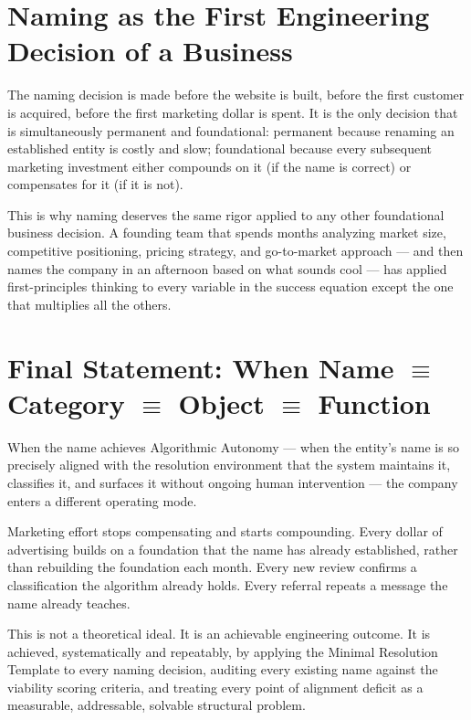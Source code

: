 \documentclass[12pt, openany]{book}
\theoremstyle{thmstyle}
\theoremstyle{defstyle}
\begin{document}
\section*{Naming as the First Engineering Decision of a Business}

The naming decision is made before the website is built, before the first customer is acquired, before the first marketing dollar is spent. It is the only decision that is simultaneously permanent and foundational: permanent because renaming an established entity is costly and slow; foundational because every subsequent marketing investment either compounds on it (if the name is correct) or compensates for it (if it is not).

This is why naming deserves the same rigor applied to any other foundational business decision. A founding team that spends months analyzing market size, competitive positioning, pricing strategy, and go-to-market approach --- and then names the company in an afternoon based on what sounds cool --- has applied first-principles thinking to every variable in the success equation except the one that multiplies all the others.

\section*{Final Statement: When Name $\equiv$ Category $\equiv$ Object $\equiv$ Function}

When the name achieves Algorithmic Autonomy --- when the entity's name is so precisely aligned with the resolution environment that the system maintains it, classifies it, and surfaces it without ongoing human intervention --- the company enters a different operating mode.

Marketing effort stops compensating and starts compounding. Every dollar of advertising builds on a foundation that the name has already established, rather than rebuilding the foundation each month. Every new review confirms a classification the algorithm already holds. Every referral repeats a message the name already teaches.

This is not a theoretical ideal. It is an achievable engineering outcome. It is achieved, systematically and repeatably, by applying the Minimal Resolution Template to every naming decision, auditing every existing name against the viability scoring criteria, and treating every point of alignment deficit as a measurable, addressable, solvable structural problem.
\end{document}
